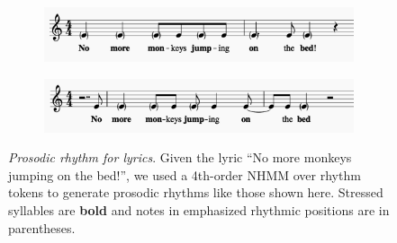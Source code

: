 \documentclass[phd,electronic,oneside,twosidetoc,letterpaper,chaptercenter,parttop,lof,lot]{byumsphd}
\begin{document}
\begin{figure}
    \centering
    \begin{subfigure}[b]{\linewidth}
        \includegraphics[width=\linewidth]{monkeys_2}
    \end{subfigure}
    \begin{subfigure}[b]{\linewidth}
        \includegraphics[width=\linewidth]{monkeys_3}
    \end{subfigure}
    \caption{\textit{Prosodic rhythm for lyrics}. Given the lyric ``No more monkeys jumping on the bed!'', we used a 4th-order NHMM over rhythm tokens to generate prosodic rhythms like those shown here. Stressed syllables are \textbf{bold} and notes in emphasized rhythmic positions are in parentheses.}
    \label{fig:monkeys}
\end{figure}



\end{document}
